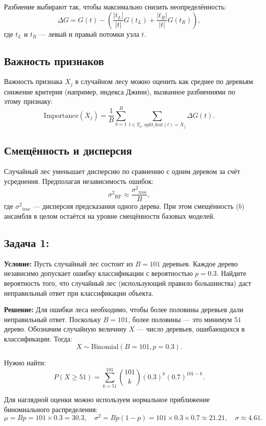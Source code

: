 Разбиение выбирают так, чтобы максимально снизить неопределённость:
\[
\Delta G = G(t) - \left( \frac{|t_L|}{|t|} G(t_L) + \frac{|t_R|}{|t|} G(t_R)\right),
\]
где \(t_L\) и \(t_R\) — левый и правый потомки узла \(t\).

\subsection*{Важность признаков}

Важность признака \(X_j\) в случайном лесу можно оценить как среднее по деревьям снижение критерия (например, индекса Джини), вызванное разбиениями по этому признаку:
\[
\text{Importance}(X_j) = \frac{1}{B} \sum_{b=1}^B \sum_{t \in T_b, \, \text{split\_feat}(t)=X_j} \Delta G(t).
\]

\subsection*{Смещённость и дисперсия}

Случайный лес уменьшает дисперсию по сравнению с одним деревом за счёт усреднения. Предполагая независимость ошибок:
\[
{\sigma^2}_{\text{RF}} \approx \frac{{\sigma^2}_{\text{tree}}}{B},
\]
где \({\sigma^2}_{\text{tree}}\) — дисперсия предсказания одного дерева. При этом смещённость ($b$) ансамбля в целом остаётся на уровне смещённости базовых моделей.

\subsection*{Задача 1:}

\textbf{Условие:} Пусть случайный лес состоит из \(B = 101\) деревьев. Каждое дерево независимо допускает ошибку классификации с вероятностью \(p = 0.3\). Найдите вероятность того, что случайный лес (использующий правило большинства) даст неправильный ответ при классификации объекта.

\textbf{Решение:} 
Для ошибки леса необходимо, чтобы более половины деревьев дали неправильный ответ. Поскольку \(B = 101\), более половины — это минимум \(51\) дерево. Обозначим случайную величину \(X\) — число деревьев, ошибающихся в классификации. Тогда:
\[
X \sim \text{Binomial}(B=101, p=0.3).
\]

Нужно найти:
\[
P(X \geq 51) = \sum_{k=51}^{101} \binom{101}{k} (0.3)^k (0.7)^{101-k}.
\]

Для наглядной оценки можно используем нормальное приближение биномиального распределения:
\[
\mu = Bp = 101 \times 0.3 = 30.3, \quad \sigma^2 = Bp(1-p) = 101 \times 0.3 \times 0.7 \approx 21.21, \quad \sigma \approx 4.61.
\]


